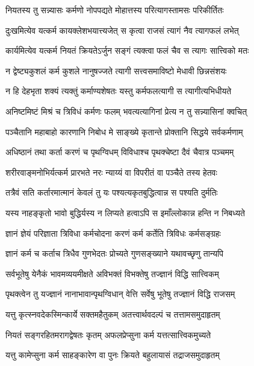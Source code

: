 \twolineshloka
{नियतस्य तु सन्न्यासः कर्मणो नोपपद्यते}
{मोहात्तस्य परित्यागस्तामसः परिकीर्तितः}%

\twolineshloka
{दुःखमित्येव यत्कर्म कायक्लेशभयात्त्यजेत्}
{स कृत्वा राजसं त्यागं नैव त्यागफलं लभेत्}%

\twolineshloka
{कार्यमित्येव यत्कर्म नियतं क्रियतेऽर्जुन}
{सङ्गं त्यक्त्वा फलं चैव स त्यागः सात्त्विको मतः}%

\twolineshloka
{न द्वेष्ट्यकुशलं कर्म कुशले नानुषज्जते}
{त्यागी सत्त्वसमाविष्टो मेधावी छिन्नसंशयः}%

\twolineshloka
{न हि देहभृता शक्यं त्यक्तुं कर्माण्यशेषतः}
{यस्तु कर्मफलत्यागी स त्यागीत्यभिधीयते}%

\twolineshloka
{अनिष्टमिष्टं मिश्रं च त्रिविधं कर्मणः फलम्}
{भवत्यत्यागिनां प्रेत्य न तु सन्न्यासिनां क्वचित्}%

\twolineshloka
{पञ्चैतानि महाबाहो कारणानि निबोध मे}
{साङ्ख्ये कृतान्ते प्रोक्तानि सिद्धये सर्वकर्मणाम्}%

\twolineshloka
{अधिष्ठानं तथा कर्ता करणं च पृथग्विधम्}
{विविधाश्च पृथक्चेष्टा दैवं चैवात्र पञ्चमम्}
{}%

\twolineshloka
{शरीरवाङ्मनोभिर्यत्कर्म प्रारभते नरः}
{न्याय्यं वा विपरीतं वा पञ्चैते तस्य हेतवः}%

\twolineshloka
{तत्रैवं सति कर्तारमात्मानं केवलं तु यः}
{पश्यत्यकृतबुद्धित्वान्न स पश्यति दुर्मतिः}%

\twolineshloka
{यस्य नाहङ्कृतो भावो बुद्धिर्यस्य न लिप्यते}
{हत्वाऽपि स इमाँल्लोकान्न हन्ति न निबध्यते}%

\twolineshloka
{ज्ञानं ज्ञेयं परिज्ञाता त्रिविधा कर्मचोदना}
{करणं कर्म कर्तेति त्रिविधः कर्मसङ्ग्रहः}%

\twolineshloka
{ज्ञानं कर्म च कर्ताच त्रिधैव गुणभेदतः}
{प्रोच्यते गुणसङ्ख्याने यथावच्छृणु तान्यपि}%

\twolineshloka
{सर्वभूतेषु येनैकं भावमव्ययमीक्षते}
{अविभक्तं विभक्तेषु तज्ज्ञानं विद्धि सात्त्विकम्}%

\twolineshloka
{पृथक्त्वेन तु यज्ज्ञानं नानाभावान्पृथग्विधान्}
{वेत्ति सर्वेषु भूतेषु तज्ज्ञानं विद्धि राजसम्}%

\twolineshloka
{यत्तु कृत्स्नवदेकस्मिन्कार्ये सक्तमहैतुकम्}
{अतत्त्वार्थवदल्पं च तत्तामसमुदाहृतम्}%

\twolineshloka
{नियतं सङ्गरहितमरागद्वेषतः कृतम्}
{अफलप्रेप्सुना कर्म यत्तत्सात्त्विकमुच्यते}%

\twolineshloka
{यत्तु कामेप्सुना कर्म साहङ्कारेण वा पुनः}
{क्रियते बहुलायासं तद्राजसमुदाहृतम्}%

